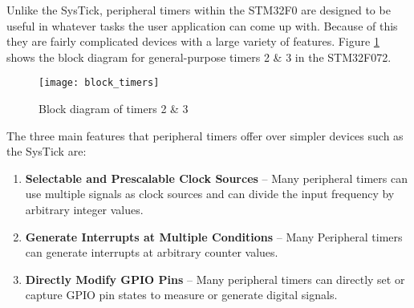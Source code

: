 \documentclass[11pt,fleqn]{book} %
\begin{document}
     Unlike the SysTick, peripheral timers within the STM32F0 are designed to be useful in whatever tasks the user application can come up with. Because of this they are fairly complicated devices with a large variety of features. Figure \ref{block_timers} shows the block diagram for general-purpose timers 2 \& 3 in the STM32F072.     
%        
        \begin{figure}[]
            \centering\texttt{[image: block\_timers]}
            \caption{Block diagram of timers 2 \& 3}
            \label{block_timers}
        \end{figure}
        
        The three main features that peripheral timers offer over simpler devices such as the SysTick are:
        \begin{enumerate}
            \item \textbf{Selectable and Prescalable Clock Sources} -- Many peripheral timers can use multiple signals as clock sources and can divide the input frequency by arbitrary integer values. 
            \item \textbf{Generate Interrupts at Multiple Conditions} -- Many Peripheral timers can generate interrupts at arbitrary counter values.
            \item \textbf{Directly Modify GPIO Pins} -- Many peripheral timers can directly set or capture GPIO pin states to measure or generate digital signals.  
        \end{enumerate}
        
    
\end{document}
